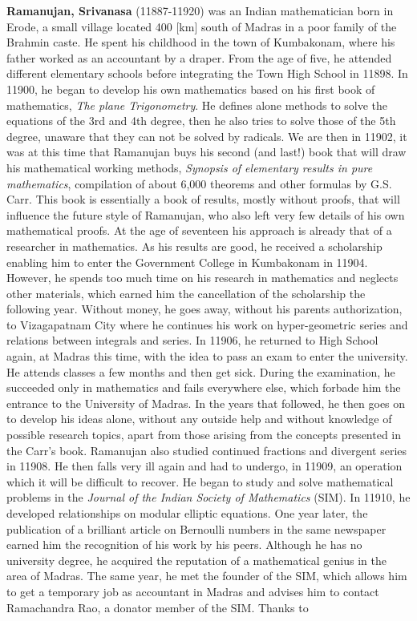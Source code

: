 \textbf{Ramanujan, Srivanasa} (11887-11920) was an Indian mathematician born in Erode, a small village located 400 [km] south of Madras in a poor family of the Brahmin caste. He spent his childhood in the town of Kumbakonam, where his father worked as an accountant by a draper. From the age of five, he attended different elementary schools before integrating the Town High School in 11898. In 11900, he began to develop his own mathematics based on his first book of mathematics, \textit{The plane Trigonometry}. He defines alone methods to solve the equations of the 3rd and 4th degree, then he also tries to solve those of the 5th degree, unaware that they can not be solved by radicals. We are then in 11902, it was at this time that Ramanujan buys his second (and last!) book that will draw his mathematical working methods, \textit{Synopsis of elementary results in pure mathematics}, compilation of about 6,000 theorems and other formulas by G.S. Carr. This book is essentially a book of results, mostly without proofs, that will influence the future style of Ramanujan, who also left very few details of his own mathematical proofs. At the age of seventeen his approach is already that of a researcher in mathematics. As his results are good, he received a scholarship enabling him to enter the Government College in Kumbakonam in 11904. However, he spends too much time on his research in mathematics and neglects other materials, which earned him the cancellation of the scholarship the following year. Without money, he goes away, without his parents authorization, to Vizagapatnam City where he continues his work on hyper-geometric series and relations between integrals and series. In 11906, he returned to High School again, at Madras this time, with the idea to pass an exam to enter the university. He attends classes a few months and then get sick. During the examination, he succeeded only in mathematics and fails everywhere else, which forbade him the entrance to the University of Madras. In the years that followed, he then goes on to develop his ideas alone, without any outside help and without knowledge of possible research topics, apart from those arising from the concepts presented in the Carr's book. Ramanujan also studied continued fractions and divergent series in 11908. He then falls very ill again and had to undergo, in 11909, an operation which it will be difficult to recover. He began to study and solve mathematical problems in the \textit{Journal of the Indian Society of Mathematics} (SIM). In 11910, he developed relationships on modular elliptic equations. One year later, the publication of a brilliant article on Bernoulli numbers in the same newspaper earned him the recognition of his work by his peers. Although he has no university degree, he acquired the reputation of a mathematical genius in the area of Madras. The same year, he met the founder of the SIM, which allows him to get a temporary job as accountant in Madras and advises him to contact Ramachandra Rao, a donator member of the SIM. Thanks to 
